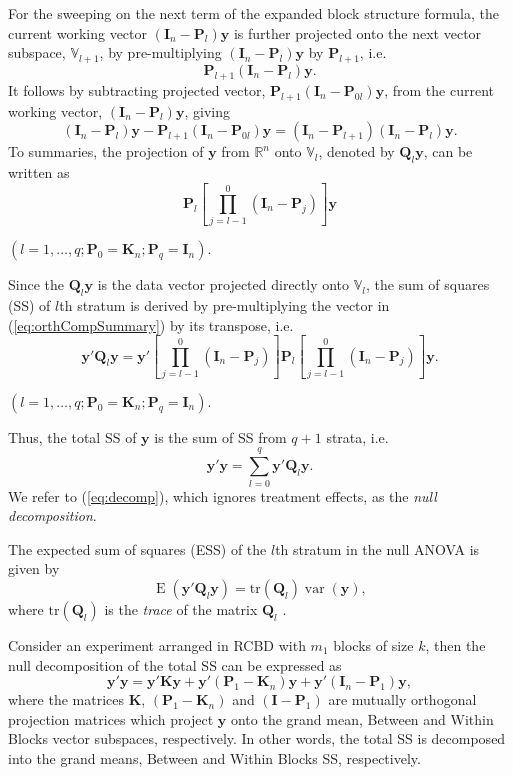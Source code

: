 \documentclass[article]{jss}
\newcommand{\mP}{\mathbf{P}}
\newcommand{\I}{\mathbf{I}}
\newcommand{\K}{\mathbf{K}}
\newcommand{\Q}{\mathbf{Q}}
\begin{document}
For the sweeping on the next term of the expanded block structure formula, the current working vector $(\I_n - \mP_{l})\bm{y}$ is further projected onto the next vector subspace, $\mathbb{V}_{l+1}$, by pre-multiplying $(\I_n - \mP_{l})\bm{y}$ by $\mP_{l+1}$, i.e.\
\[
\mP_{l+1}(\I_n - \mP_{l})\bm{y}.
\] 
It follows by subtracting projected vector, $\mP_{l+1}(\I_n - \mP_{0l})\bm{y}$, from the current working vector, $(\I_n - \mP_{l})\bm{y}$, giving 
\[
(\I_n - \mP_{l})\bm{y} - \mP_{l+1}(\I_n - \mP_{0l})\bm{y} = (\I_n - \mP_{l+1})(\I_n - \mP_{l})\bm{y}.
\]
To summaries, the projection of $\bm{y}$ from $\mathbb{R}^n$ onto $\mathbb{V}_{l}$, denoted by $\Q_{l}\bm{y}$, can be written as 
\begin{equation}
\label{eq:orthCompSummary}
\mP_{l} \left[\prod_{j = l -1}^{0}(\I_n -\mP_{j})\right]\bm{y}
\end{equation}
\begin{center}
$(l = 1,\dots, q; \mP_0 = \K_n; \mP_q = \I_n).$
\end{center}

Since the $\Q_l \bm{y}$ is the data vector projected directly onto $\mathbb{V}_l$, the sum of squares (SS) of $l$th stratum is derived by pre-multiplying the vector in (\ref{eq:orthCompSummary}) by its transpose, i.e.\
\begin{equation}
\label{eq:SSSummary}
\bm{y}'\Q_{l} \bm{y} = \bm{y}' \left[\prod_{j = l -1}^{0}(\I_n -\mP_{j})\right]\mP_{l} \left[\prod_{j = l -1}^{0}(\I_n -\mP_{j})\right]\bm{y}.
\end{equation}
\begin{center}
$(l = 1,\dots, q; \mP_0 = \K_n; \mP_q = \I_n).$
\end{center}
Thus, the total SS of $\bm{y}$ is the sum of SS from $q + 1$ strata, i.e.\ 
\begin{equation}
\label{eq:decomp}
\bm{y}'\bm{y} = \sum_{l=0}^{q}\bm{y}'\Q_l\bm{y}.
\end{equation}  
We refer to (\ref{eq:decomp}), which ignores treatment effects, as the \emph{null decomposition}. 

The expected sum of squares (ESS) of the $l$th stratum in the null ANOVA is given by
\begin{equation}
\label{eq:ESSQuad}
\operatorname{E}(\bm{y}'\Q_l\bm{y})= \mathrm{tr}(\Q_l)\operatorname{var}(\bm{y}),
\end{equation}
where $\mathrm{tr}(\Q_l)$ is the \emph{trace} of the matrix $\Q_l$ \citep{Searle1982}. 

Consider an experiment arranged in RCBD with $m_1$ blocks of size $k$, then the null decomposition of the total SS can be expressed as 
\begin{equation}
\label{eq:infoDecomp1}
\bm{y}'\bm{y} = \bm{y}'\K\bm{y} + \bm{y}'(\mP_{1}-\K_n)\bm{y} + \bm{y}'(\I_n - \mP_{1})\bm{y},
\end{equation}
where the matrices $\K$,  $(\mP_{1}-\K_n)$ and $(\I - \mP_{1})$ are mutually orthogonal projection matrices which project $\bm{y}$ onto the grand mean, Between and Within Blocks vector subspaces, respectively. In other words, the total SS is decomposed into the grand means, Between and Within Blocks SS, respectively.
\end{document}
